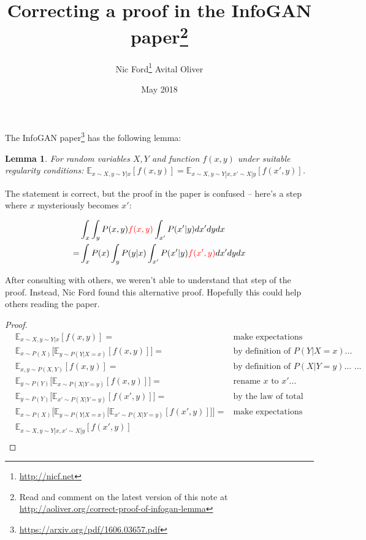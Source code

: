 \documentclass{article}
\title{Correcting a proof in the InfoGAN paper\footnote{Read and comment on the latest version of this note at \url{http://aoliver.org/correct-proof-of-infogan-lemma}}
}
\author{Nic Ford\footnote{\url{http://nicf.net}} \cr Avital Oliver}
\date{May 2018}
\newtheorem{lemma}[theorem]{Lemma}
\begin{document}
\maketitle


The
InfoGAN paper\footnote{\url{https://arxiv.org/pdf/1606.03657.pdf}} %
has the following lemma:

\setcounter{section}{5} %

\begin{lemma}
For random variables $X, Y$ and function $f(x, y)$ under suitable regularity conditions:
$\mathbb{E}_{x \sim X, y \sim Y|x}[f(x, y)] = 
 \mathbb{E}_{x \sim X, y \sim Y|x, x' \sim X|y}[f(x', y)]$.
\end{lemma}

The statement is correct, but the proof in the paper is confused -- here's a step where $x$ mysteriously becomes $x'$:


\begin{align*}
& \int_x \int_y P(x,y) {\color{red}{f(x,y)}} \int_{x'} P(x' | y)dx'dydx \\
= & \int_x P(x) \int_y P(y|x) \int_{x'} P(x'|y) {\color{red}{f(x',y)}} dx' dy dx
\end{align*}

After consulting with others, we weren't able to understand that step of the proof. Instead, Nic Ford found this alternative proof. Hopefully this could help others reading the paper.

\begin{proof}
\begin{align*}
   & \mathbb{E}_{x \sim X,y \sim Y|x}[f(x, y)] = & \mbox{make expectations explicit...} \\
   & \mathbb{E}_{x \sim P(X)}\big[\mathbb{E}_{y \sim P(Y|X=x)}[f(x, y)]\big] = & \mbox{by definition of $P(Y|X=x)$...} \\
   & \mathbb{E}_{x,y \sim P(X,Y)}[f(x, y)] = & \mbox{by definition of $P(X|Y=y)$... ...} \\
   & \mathbb{E}_{y \sim P(Y)}\big[\mathbb{E}_{x \sim P(X|Y=y)}[f(x, y)]\big] = & \mbox{rename $x$ to $x'$...} \\
   & \mathbb{E}_{y \sim P(Y)}\big[\mathbb{E}_{x' \sim P(X|Y=y)}[f(x', y)]\big] = & \mbox{by the law of total expectation...} \\
   & \mathbb{E}_{x \sim P(X)}\Big[\mathbb{E}_{y \sim P(Y|X=x)}\big[\mathbb{E}_{x' \sim P(X|Y=y)}[f(x', y)]\big]\Big] = &  \mbox{make expectations implicit...} \\
   & \mathbb{E}_{x \sim X,y \sim Y|x,x' \sim X|y}[f(x', y)] & \\
\end{align*}
\end{proof}

\end{document}
